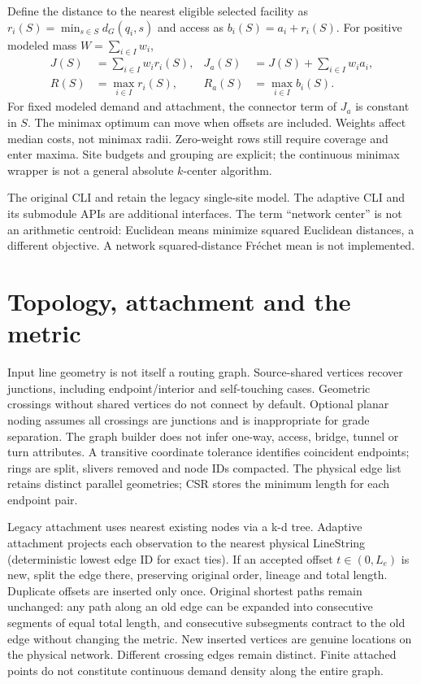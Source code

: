 \documentclass[11pt,a4paper]{article}
\newcommand{\code}[1]{\texttt{\detokenize{#1}}}
\newcommand{\dist}{d_G}
\newcommand{\minsite}{\min_{s\in S}}
\begin{document}
Define the distance to the nearest eligible selected facility as $r_i(S)=\minsite \dist(q_i,s)$ and access as $b_i(S)=a_i+r_i(S)$. For positive modeled mass $W=\sum_{i\in I}w_i$,
\begin{align*}
J(S)&=\sum_{i\in I}w_i r_i(S), &
J_a(S)&=J(S)+\sum_{i\in I} w_i a_i,\\
R(S)&=\max_{i\in I}r_i(S), & R_a(S)&=\max_{i\in I}b_i(S).
\end{align*}
For fixed modeled demand and attachment, the connector term of $J_a$ is constant in $S$. The minimax optimum can move when offsets are included. Weights affect median costs, not minimax radii. Zero-weight rows still require coverage and enter maxima. Site budgets and grouping are explicit; the continuous minimax wrapper is not a general absolute $k$-center algorithm.

The original CLI and \code{solve} retain the legacy single-site model. The adaptive CLI and its submodule APIs are additional interfaces. The term ``network center'' is not an arithmetic centroid: Euclidean means minimize squared Euclidean distances, a different objective. A network squared-distance Fr\'echet mean is not implemented.
\section{Topology, attachment and the metric}
Input line geometry is not itself a routing graph. Source-shared vertices recover junctions, including endpoint/interior and self-touching cases. Geometric crossings without shared vertices do not connect by default. Optional planar noding assumes all crossings are junctions and is inappropriate for grade separation. The graph builder does not infer one-way, access, bridge, tunnel or turn attributes. A transitive coordinate tolerance identifies coincident endpoints; rings are split, slivers removed and node IDs compacted. The physical edge list retains distinct parallel geometries; CSR stores the minimum length for each endpoint pair.

Legacy attachment uses nearest existing nodes via a k-d tree. Adaptive attachment projects each observation to the nearest physical LineString (deterministic lowest edge ID for exact ties). If an accepted offset $t\in(0,L_e)$ is new, split the edge there, preserving original order, lineage and total length. Duplicate offsets are inserted only once. Original shortest paths remain unchanged: any path along an old edge can be expanded into consecutive segments of equal total length, and consecutive subsegments contract to the old edge without changing the metric. New inserted vertices are genuine locations on the physical network. Different crossing edges remain distinct. Finite attached points do not constitute continuous demand density along the entire graph.
\end{document}
